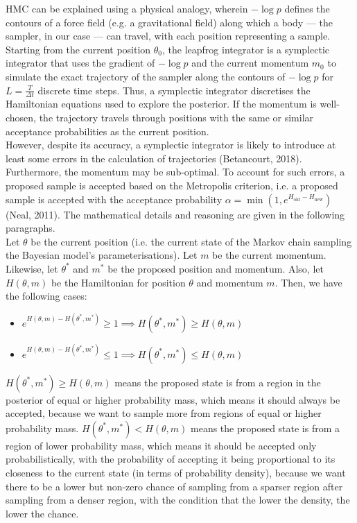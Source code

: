 \documentclass[conference]{IEEEtran}
\begin{document}
HMC can be explained using a physical analogy, wherein $-\log p$ defines the contours of a force field (e.g. a gravitational field) along which a body — the sampler, in our case — can travel, with each position representing a sample. Starting from the current position $\theta_0$, the leapfrog integrator is a symplectic integrator that uses the gradient of $-\log p$ and the current momentum $m_0$ to simulate the exact trajectory of the sampler along the contours of $-\log p$ for $L = \frac{T}{\Delta t}$ discrete time steps. Thus, a symplectic integrator discretises the Hamiltonian equations used to explore the posterior. If the momentum is well-chosen, the trajectory travels through positions with the same or similar acceptance probabilities as the current position.\\

However, despite its accuracy, a symplectic integrator is likely to introduce at least some errors in the calculation of trajectories (Betancourt, 2018). Furthermore, the momentum may be sub-optimal. To account for such errors, a proposed sample is accepted based on the Metropolis criterion, i.e. a proposed sample is accepted with the acceptance probability $\alpha = \min(1, e^{H_\text{old} - H_\text{new}})$ (Neal, 2011). The mathematical details and reasoning are given in the following paragraphs.\\

Let $\theta$ be the current position (i.e. the current state of the Markov chain sampling the Bayesian model's parameterisations). Let $m$ be the current momentum. Likewise, let $\theta^*$ and $m^*$ be the proposed position and momentum. Also, let $H(\theta, m)$ be the Hamiltonian for position $\theta$ and momentum $m$. Then, we have the following cases:\\

\begin{itemize}
	\item $e^{H(\theta, m) - H(\theta^*, m^*)} \geq 1 \implies H(\theta^*, m^*) \geq H(\theta, m)$
	\item $e^{H(\theta, m) - H(\theta^*, m^*)} \leq 1 \implies H(\theta^*, m^*) \leq H(\theta, m)$\\
\end{itemize}

$H(\theta^*, m^*) \geq H(\theta, m)$ means the proposed state is from a region in the posterior of equal or higher probability mass, which means it should always be accepted, because we want to sample more from regions of equal or higher probability mass. $H(\theta^*, m^*) < H(\theta, m)$ means the proposed state is from a region of lower probability mass, which means it should be accepted only probabilistically, with the probability of accepting it being proportional to its closeness to the current state (in terms of probability density), because we want there to be a lower but non-zero chance of sampling from a sparser region after sampling from a denser region, with the condition that the lower the density, the lower the chance.
\end{document}

